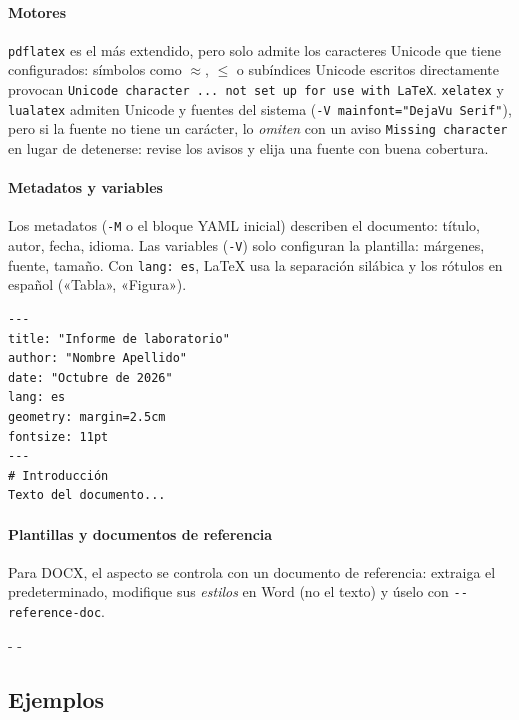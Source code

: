 \documentclass[11pt,a4paper]{article}
\makeatletter
\newcommand{\necesitaespacio}[1]{\par\penalty-100\begingroup
	\setlength{\dimen@}{#1}\dimen@ii\pagegoal\advance\dimen@ii-\pagetotal
	\ifdim\dimen@>\dimen@ii\ifdim\dimen@ii>\z@\vfil\fi\penalty-\@M\fi\endgroup}
\newcommand{\cmd}[1]{\texttt{\textcolor{colcmd}{#1}}}      %
\newcommand{\opt}[1]{\texttt{\textcolor{colopt}{#1}}}      %
\newcommand{\val}[1]{\texttt{#1}}                          %
\makeatother
\begin{document}
	\paragraph{Motores} \cmd{pdflatex} es el más extendido, pero solo admite los caracteres Unicode que tiene configurados: símbolos como $\approx$, $\leq$ o subíndices Unicode escritos directamente provocan \texttt{Unicode character ... not set up for use with LaTeX}. \cmd{xelatex} y \cmd{lualatex} admiten Unicode y fuentes del sistema (\opt{-V mainfont="DejaVu Serif"}), pero si la fuente no tiene un carácter, lo \emph{omiten} con un aviso \texttt{Missing character} en lugar de detenerse: revise los avisos y elija una fuente con buena cobertura.
	
	\paragraph{Metadatos y variables} Los metadatos (\opt{-M} o el bloque YAML inicial) describen el documento: título, autor, fecha, idioma. Las variables (\opt{-V}) solo configuran la plantilla: márgenes, fuente, tamaño. Con \val{lang: es}, LaTeX usa la separación silábica y los rótulos en español («Tabla», «Figura»).
	
	\begin{lstlisting}[style=salida]
---
title: "Informe de laboratorio"
author: "Nombre Apellido"
date: "Octubre de 2026"
lang: es
geometry: margin=2.5cm
fontsize: 11pt
---
# Introducción
Texto del documento...
\end{lstlisting}
	
	\paragraph{Plantillas y documentos de referencia} Para DOCX, el aspecto se controla con un documento de referencia: extraiga el predeterminado, modifique sus \emph{estilos} en Word (no el texto) y úselo con \opt{-{}-reference-doc}.
	
	\necesitaespacio{8\baselineskip}
	\subsection{Ejemplos}
	
\end{document}
